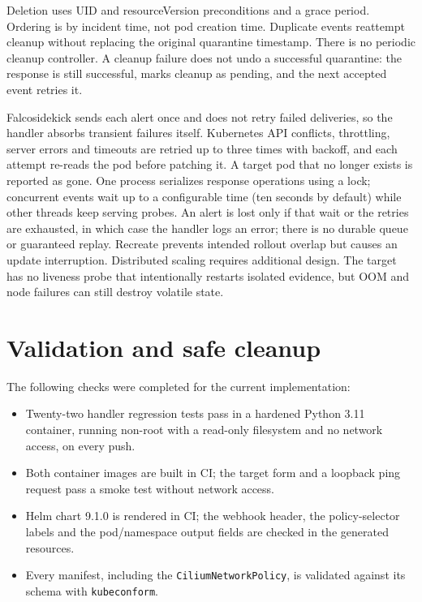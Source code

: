 Deletion uses UID and resourceVersion preconditions and a grace period. Ordering is
by incident time, not pod creation time. Duplicate events reattempt cleanup without
replacing the original quarantine timestamp. There is no periodic cleanup controller.
A cleanup failure does not undo a successful quarantine: the response is still
successful, marks cleanup as pending, and the next accepted event retries it.

Falcosidekick sends each alert once and does not retry failed deliveries, so the
handler absorbs transient failures itself. Kubernetes API conflicts, throttling,
server errors and timeouts are retried up to three times with backoff, and each
attempt re-reads the pod before patching it. A target pod that no longer exists is
reported as gone. One process serializes response operations using a lock; concurrent
events wait up to a configurable time (ten seconds by default) while other threads
keep serving probes. An alert is lost only if that wait or the retries are exhausted,
in which case the handler logs an error; there is no durable queue or guaranteed
replay. Recreate prevents intended rollout overlap but causes an update interruption.
Distributed scaling requires additional design.
The target has no liveness probe that intentionally restarts isolated evidence, but
OOM and node failures can still destroy volatile state.

\section{Validation and safe cleanup}

The following checks were completed for the current implementation:
\begin{itemize}
\item Twenty-two handler regression tests pass in a hardened Python 3.11 container,
running non-root with a read-only filesystem and no network access, on every push.
\item Both container images are built in CI; the target form and a loopback ping
request pass a smoke test without network access.
\item Helm chart 9.1.0 is rendered in CI; the webhook header, the policy-selector
labels and the pod/namespace output fields are checked in the generated resources.
\item Every manifest, including the \texttt{CiliumNetworkPolicy}, is validated
against its schema with \texttt{kubeconform}.
\end{itemize}

